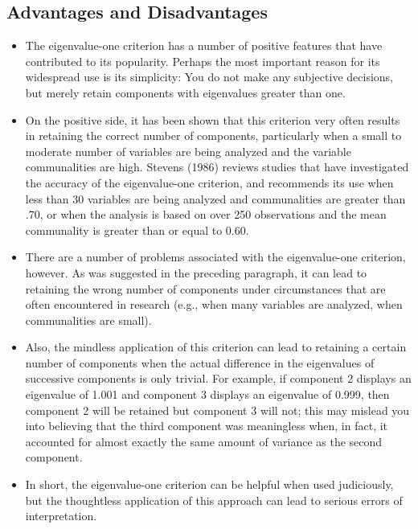 \documentclass[]{article}
\begin{document}
\subsection{Advantages and Disadvantages}

\begin{itemize}
\item
The eigenvalue-one criterion has a number of positive features that have contributed to its
popularity.  Perhaps the most important reason for its widespread use is its simplicity:  You do
not make any subjective decisions, but merely retain components with eigenvalues greater than
one.

\item On the positive side, it has been shown that this criterion very often results in retaining the
correct number of components, particularly when a small to moderate number of variables are
being analyzed and the variable communalities are high.  Stevens (1986) reviews studies that
have investigated the accuracy of the eigenvalue-one criterion, and recommends its use when
less than 30 variables are being analyzed and communalities are greater than .70, or when the
analysis is based on over 250 observations and the mean communality is greater than or equal to
0.60.

\item There are a number of problems associated with the eigenvalue-one criterion, however.  As was
suggested in the preceding paragraph, it can lead to retaining the wrong number of components
under circumstances that are often encountered in research (e.g., when many variables are
analyzed, when communalities are small).

\item Also, the mindless application of this criterion can
lead to retaining a certain number of components when the actual difference in the eigenvalues
of successive components is only trivial.  For example, if component 2 displays an eigenvalue of
1.001 and component 3 displays an eigenvalue of 0.999, then component 2 will be retained but
component 3 will not; this may mislead you into believing that the third component was
meaningless when, in fact, it accounted for almost exactly the same amount of variance as the
second component.

\item In short, the eigenvalue-one criterion can be helpful when used judiciously,
but the thoughtless application of this approach can lead to serious errors of interpretation.
\end{itemize}
\newpage
\end{document}
